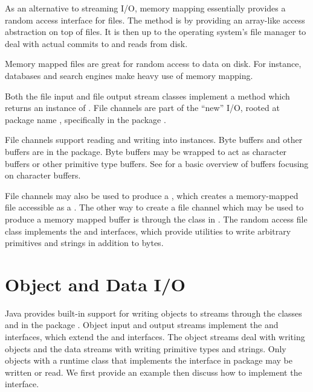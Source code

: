 As an alternative to streaming I/O, memory mapping essentially
provides a random access interface for files.  The method is by
providing an array-like access abstraction on top of files.  It is
then up to the operating system's file manager to deal with actual
commits to and reads from disk.

Memory mapped files are great for random access to data on disk.  For
instance, databases and search engines make heavy use of memory
mapping.

Both the file input and file output stream classes implement a
 method which returns an instance of
.  File channels are part of the ``new'' I/O,
rooted at package name , specifically in the
package .  

File channels support reading and writing into 
instances.  Byte buffers and other buffers are in the 
package.  Byte buffers may be wrapped to act as character buffers or
other primitive type buffers.  See  for a
basic overview of buffers focusing on character buffers.

File channels may also be used to produce a ,
which creates a memory-mapped file accessible as a .
The other way to create a file channel which may be used to produce a
memory mapped buffer is through the  class in
.  The random access file class implements the
 and  interfaces, which provide utilities
to write arbitrary primitives and strings in addition to bytes.

\section{Object and Data I/O}\label{section:io-object-data-io}

Java provides built-in support for writing objects to streams through
the classes  and  in
the package .  Object input and output streams implement
the  and  interfaces, which
extend the  and  interfaces.  The
object streams deal with writing objects and the data streams with
writing primitive types and strings.  Only objects with a runtime
class that implements the  interface in package
 may be written or read.  We first provide an example
then discuss how to implement the  interface.


